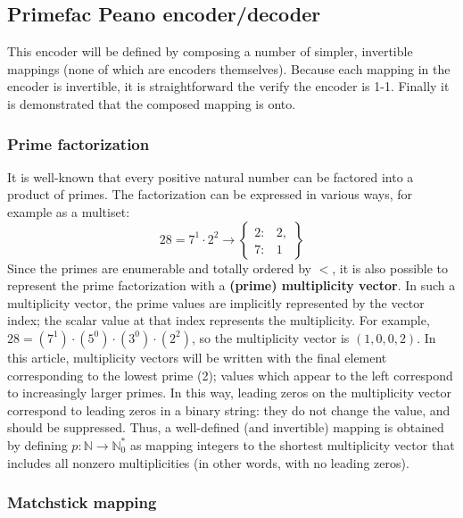 \documentclass[12pt,reqno]{article}
\begin{document}
\subsection{Primefac Peano encoder/decoder}

This encoder will be defined by composing a number of simpler, invertible mappings (none of which are encoders themselves). Because each mapping in the encoder is invertible, it is straightforward the verify the encoder is 1-1. Finally it is demonstrated that the composed mapping is onto.

\subsubsection{Prime factorization}

It is well-known that every positive natural number can be factored into a product of primes. The factorization can be expressed in various ways, for example as a multiset:
\begin{equation}
28 = 7^1 \cdot 2^2 \rightarrow \begin{Bmatrix}
        2: & 2, \\
        7: & 1
    \end{Bmatrix}
\end {equation}
Since the primes are enumerable and totally ordered by $<$, it is also possible to represent the prime factorization with a \textbf{(prime) multiplicity vector}. In such a multiplicity vector, the prime values are implicitly represented by the vector index; the scalar value at that index represents the multiplicity. For example, $28 = (7^1) \cdot (5^0) \cdot (3^0) \cdot (2^2)$, so the multiplicity vector is $(1, 0, 0, 2)$. In this article, multiplicity vectors will be written with the final element corresponding to the lowest prime (2); values which appear to the left correspond to increasingly larger primes. In this way, leading zeros on the multiplicity vector correspond to leading zeros in a binary string: they do not change the value, and should be suppressed. Thus, a well-defined (and invertible) mapping is obtained by defining $p : \mathbb{N} \rightarrow \mathbb{N}_0^{*}$ as mapping integers to the shortest multiplicity vector that includes all nonzero multiplicities (in other words, with no leading zeros).

\subsubsection{Matchstick mapping}
\end{document}
